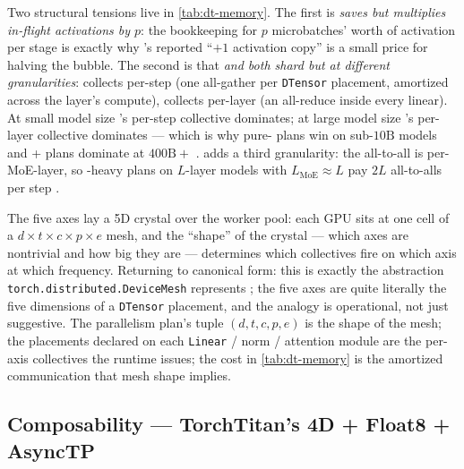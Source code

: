 Two structural tensions live in \cref{tab:dt-memory}. The first is
\emph{ saves  but multiplies in-flight activations by
$p$}: the bookkeeping for $p$ microbatches' worth of activation per
stage is exactly why 's reported ``$+1$ activation copy''
\citep[\S 3.2.1]{deepseek-v3} is a small price for halving the bubble.
The second is that \emph{ and  both shard  but at
different granularities}:  collects per-step (one all-gather per
\texttt{DTensor} placement, amortized across the layer's compute), 
collects per-layer (an all-reduce inside every linear). At small model
size 's per-step collective dominates; at large model size 's
per-layer collective dominates --- which is why pure- plans win on
sub-$10\text{B}$ models and + plans dominate at $400\text{B}{+}$
\citep[\S 1; \S 2.1.3]{torchtitan2024}.  adds a third granularity:
the all-to-all is per-MoE-layer, so -heavy plans on $L$-layer models
with $L_{\text{MoE}} \approx L$ pay $2 L$ all-to-alls per step
\citep[\S 3.2]{deepseek-v3}.

\begin{analogy}
The five axes lay a 5D crystal over the worker pool: each GPU sits at
one cell of a $d \times t \times c \times p \times e$ mesh, and the
``shape'' of the crystal --- which axes are nontrivial and how big they
are --- determines which collectives fire on which axis at which
frequency. Returning to canonical form: this is exactly the abstraction
\texttt{torch.distributed.DeviceMesh} represents \citep[\S
2.1.1]{torchtitan2024}; the five axes are quite literally the five
dimensions of a \texttt{DTensor} placement, and the analogy is
operational, not just suggestive. The parallelism plan's tuple
$(d, t, c, p, e)$ is the shape of the mesh; the placements declared on
each \texttt{Linear} / norm / attention module are the per-axis
collectives the runtime issues; the cost in \cref{tab:dt-memory} is the
amortized communication that mesh shape implies.
\end{analogy}

\subsection{Composability --- TorchTitan's 4D + Float8 + AsyncTP}
\label{sec:dt-torchtitan}

